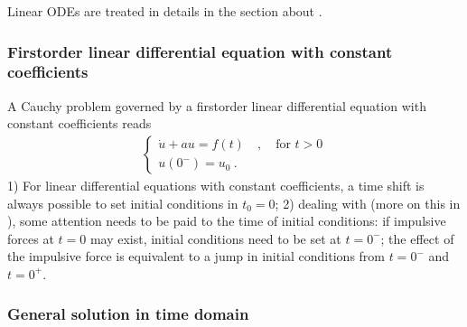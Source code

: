 \documentclass[letterpaper,10pt,english]{jupyterBook}
\begin{document}
\sphinxAtStartPar
Linear ODEs are treated in details in the section about {\hyperref[\detokenize{ch/system-theory/lti:ode-lti}]{}}.


\subsubsection{First\sphinxhyphen{}order linear differential equation with constant coefficients}
\label{\detokenize{ch/complex/laplace-applications:first-order-linear-differential-equation-with-constant-coefficients}}
\sphinxAtStartPar
A Cauchy problem governed by a first\sphinxhyphen{}order linear differential equation with constant coefficients reads
\begin{equation*}
\begin{split}\begin{cases}
  \dot{u} + a u = f(t)  \quad , \quad \text{for $t > 0$} \\
  u(0^-) = u_0 \ .
\end{cases}\end{split}
\end{equation*}
\sphinxAtStartPar
{} 1) For linear differential equations with constant coefficients, a time shift is always possible to set initial conditions in \(t_0 = 0\); 2) dealing with  (more on this in {\hyperref[\detokenize{ch/system-theory/lti:ode-lti-impulsive-force}]{}}), some attention needs to be paid to the time of initial conditions: if impulsive forces at \(t = 0\) may exist, initial conditions need to be set at \(t=0^-\); the effect of the impulsive force is equivalent to a jump in initial conditions from \(t=0^-\) and \(t=0^+\).
\subsubsection*{General solution in time domain}
\end{document}
